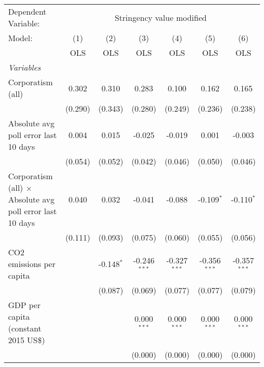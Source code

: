 
\begingroup
\centering
\begin{tabular}{lcccccc}
   \toprule
   Dependent Variable: & \multicolumn{6}{c}{Stringency value modified}\\
   Model:                                                           & (1)     & (2)          & (3)            & (4)            & (5)            & (6)\\  
                                                                    &  OLS    & OLS          & OLS            & OLS            & OLS            & OLS\\  
   \midrule
   \emph{Variables}\\
   Corporatism (all)                                                & 0.302   & 0.310        & 0.283          & 0.100          & 0.162          & 0.165\\   
                                                                    & (0.290) & (0.343)      & (0.280)        & (0.249)        & (0.236)        & (0.238)\\   
   Absolute avg poll error last 10 days                             & 0.004   & 0.015        & -0.025         & -0.019         & 0.001          & -0.003\\   
                                                                    & (0.054) & (0.052)      & (0.042)        & (0.046)        & (0.050)        & (0.046)\\   
   Corporatism (all) $\times$ Absolute avg poll error last 10 days  & 0.040   & 0.032        & -0.041         & -0.088         & -0.109$^{*}$   & -0.110$^{*}$\\   
                                                                    & (0.111) & (0.093)      & (0.075)        & (0.060)        & (0.055)        & (0.056)\\   
   CO2 emissions per capita                                         &         & -0.148$^{*}$ & -0.246$^{***}$ & -0.327$^{***}$ & -0.356$^{***}$ & -0.357$^{***}$\\   
                                                                    &         & (0.087)      & (0.069)        & (0.077)        & (0.077)        & (0.079)\\   
   GDP per capita (constant 2015 US\$)                              &         &              & 0.000$^{***}$  & 0.000$^{***}$  & 0.000$^{***}$  & 0.000$^{***}$\\   
                                                                    &         &              & (0.000)        & (0.000)        & (0.000)        & (0.000)\\   

\end{tabular}
